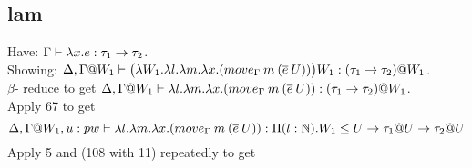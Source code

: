 \documentclass{article}
\begin{document}
\subsection{lam}
Have: $\Gamma \vdash \lambda x. e : \tau_1 \rightarrow \tau_2$. \\
Showing: $\Delta,\Gamma@W_1 \vdash \big(\lambda W_1. \lambda l. \lambda m . \lambda x. (move_{\Gamma}\:m\:(\overline{e} \: U)) \big) W_1 : (\tau_1 \imp \tau_2) @ W_1$. \\
$\beta$- reduce to get 
 $\Delta,\Gamma@W_1 \vdash  \lambda l. \lambda m . \lambda x. (move_{\Gamma}\:m\:(\overline{e} \: U)) : (\tau_1 \imp \tau_2) @ W_1$.\\
 Apply 67 to get 
 \[\Delta,\Gamma@W_1, u: pw \vdash  \lambda l. \lambda m . \lambda x. (move_{\Gamma}\:m\:(\overline{e} \: U)) : \Pi(l:\N).W_1 \leq U \imp \tau_1@U \imp \tau_2@U\]
 Apply 5 and (108 with 11) repeatedly to get
\end{document}
